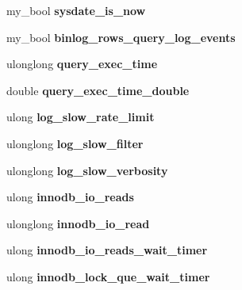 \begin{DoxyCompactItemize}
my\+\_\+bool {\bfseries sysdate\+\_\+is\+\_\+now}
\item 
\mbox{\label{structsystem__variables_ad3120b02429e7dfeaec2016677a49a3e}} 
my\+\_\+bool {\bfseries binlog\+\_\+rows\+\_\+query\+\_\+log\+\_\+events}
\item 
\mbox{\label{structsystem__variables_a6dbbf89697f2516e6aeeb5ea0b8c8b31}} 
ulonglong {\bfseries query\+\_\+exec\+\_\+time}
\item 
\mbox{\label{structsystem__variables_a808ac7970853be0385efbdf44a4584fa}} 
double {\bfseries query\+\_\+exec\+\_\+time\+\_\+double}
\item 
\mbox{\label{structsystem__variables_a8ecfcc14eb581595d4c5075cb0e488d2}} 
ulong {\bfseries log\+\_\+slow\+\_\+rate\+\_\+limit}
\item 
\mbox{\label{structsystem__variables_ae3cef0500e3df7a2ffd07fdd643927bd}} 
ulonglong {\bfseries log\+\_\+slow\+\_\+filter}
\item 
\mbox{\label{structsystem__variables_a74c77c27d86c5c5c57b421ed2ad04005}} 
ulonglong {\bfseries log\+\_\+slow\+\_\+verbosity}
\item 
\mbox{\label{structsystem__variables_a9d4b51285539c584b6a61024322d4e89}} 
ulong {\bfseries innodb\+\_\+io\+\_\+reads}
\item 
\mbox{\label{structsystem__variables_a5ffec2f70641255312c009945db84dc6}} 
ulonglong {\bfseries innodb\+\_\+io\+\_\+read}
\item 
\mbox{\label{structsystem__variables_a6a7e71587163f6ff06a3b4ddfaf95ba3}} 
ulong {\bfseries innodb\+\_\+io\+\_\+reads\+\_\+wait\+\_\+timer}
\item 
\mbox{\label{structsystem__variables_a1137c6c2a8040a9a6a5ca8a854894e63}} 
ulong {\bfseries innodb\+\_\+lock\+\_\+que\+\_\+wait\+\_\+timer}
\item 
\mbox{\label{structsystem__variables_a537a2e403eee318912d80f8478dc5b8a}} 

\end{DoxyCompactItemize}
